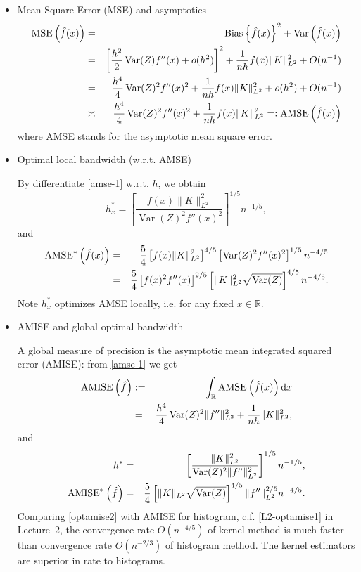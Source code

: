 \documentclass[19pt,landscape]{article}
\newcommand{\R}{\mathbb{R}}
\DeclareMathOperator{\var}{\mathrm{Var}}
\DeclareMathOperator{\bs}{\mathrm{Bias}}
\begin{document}
\begin{itemize}
    \item Mean Square Error (MSE) and asymptotics 
\begin{eqnarray}
    {\rm MSE}\left(\hat{f}(x)\right)&=&\bs\left\{\hat{f}(x)\right\}^2+\var\left(\hat{f}(x)\right)\nonumber\\
    &=&\left[\frac{h^2}2\var(Z)f''(x)+o(h^2)\right]^2+\frac1{nh}f(x)\|K\|_{L^2}^2+O(n^{-1})\nonumber\\
    &=&\frac{h^4}4\var(Z)^2f''(x)^2+\frac1{nh}f(x)\|K\|_{L^2}^2+o(h^2)+O(n^{-1})\\
    &\asymp&\frac{h^4}4\var(Z)^2f''(x)^2+\frac1{nh}f(x)\|K\|_{L^2}^2=:{\rm AMSE}\left(\hat{f}(x)\right)\label{amse-1}
\end{eqnarray}
where {\rm AMSE} stands for the asymptotic mean square error. 
\item Optimal local bandwidth (w.r.t. AMSE)

By differentiate \eqref{amse-1} w.r.t. $h$, we obtain 
\begin{equation}
    h^*_x=\left[\frac{f(x)\|K\|_{L^2}^2}{\var(Z)^2f''(x)^2}\right]^{1/5}n^{-1/5},
\end{equation}
and 
\begin{eqnarray}
    {\rm AMSE}^*\left(\hat{f}(x)\right)&=&\frac54\left[f(x)\|K\|_{L^2}^2\right]^{4/5}\left[\var(Z)^2f''(x)^2\right]^{1/5}n^{-4/5}\\
    &=&\frac54\left[f(x)^2f''(x)\right]^{2/5}\left[\|K\|_{L^2}^2\sqrt{\var(Z)}\right]^{4/5}n^{-4/5}.
\end{eqnarray}
Note $h^*_x$ optimizes AMSE locally, i.e. for any fixed $x\in\R$. 
\item AMISE and global optimal bandwidth 

A global measure of precision is the asymptotic mean integrated squared error (AMISE): from \eqref{amse-1} we get 
\begin{eqnarray}
    {\rm AMISE}\left(\hat{f}\right)&:=&\int_{\R}{\rm AMSE}\left(\hat{f}(x)\right)\mathrm{d}x\\
    &=&\frac{h^4}4\var(Z)^2\|f''\|_{L^2}^2+\frac1{nh}\|K\|_{L^2}^2,
\end{eqnarray}
and 
\begin{eqnarray}
    h^*&=&\left[\frac{\|K\|_{L^2}^2}{\var(Z)^2\|f''\|_{L^2}^2}\right]^{1/5}n^{-1/5},\\
    {\rm AMISE}^*\left(\hat{f}\right)&=&\frac54\left[\|K\|_{L^2}\sqrt{\var(Z)}\right]^{4/5}\|f''\|_{L^2}^{2/5}n^{-4/5}. \label{optamise2}
\end{eqnarray}
Comparing \eqref{optamise2} with AMISE for histogram, c.f. \eqref{L2-optamise1} in Lecture~2, the convergence rate $O(n^{-4/5})$ of kernel method is much faster than convergence rate $O(n^{-2/3})$  of histogram method. The kernel estimators are superior in rate to histograms. 


\end{itemize}
\end{document}
